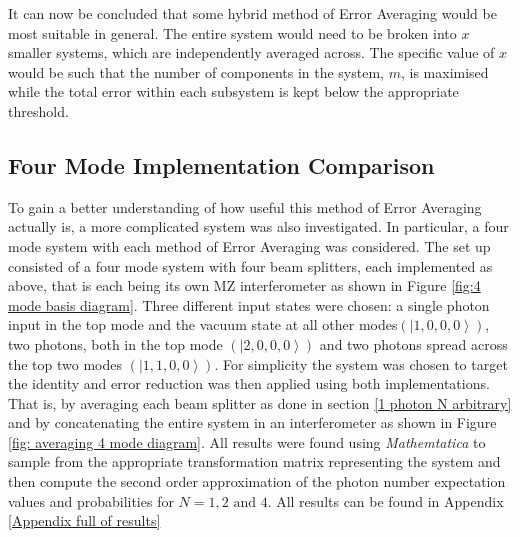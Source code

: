 \documentclass[aps,pra,twocolumn,superscriptaddress,numerical,floatfix]{revtex4-1}
\begin{document}
It can now be concluded that some hybrid method of Error Averaging would be most suitable in general. The entire system would need to be broken into $x$ smaller systems, which are independently averaged across. The specific value of $x$ would be such that the number of components in the system, $m$, is maximised while the total error within each subsystem is kept below the appropriate threshold.

\subsection{Four Mode Implementation Comparison \label{Four Mode Impementation Comparison}}

To gain a better understanding of how useful this method of Error Averaging actually is, a more complicated system was also investigated. In particular, a four mode system with each method of Error Averaging was considered. The set up consisted of a four mode system with four beam splitters, each implemented as above, that is each being its own MZ interferometer as shown in Figure \ref{fig:4 mode basis diagram}. Three different input states were chosen: a single photon input in the top mode and the vacuum state at all other modes$\left(\left|1,0,0,0\right\rangle \right)$, two photons, both in the top mode $\left(\left|2,0,0,0\right\rangle \right)$ and two photons spread across the top two modes $\left(\left|1,1,0,0\right\rangle \right)$. For simplicity the system was chosen to target the identity and error reduction was then applied using both implementations. That is, by averaging each beam splitter as done in section \ref{1 photon N arbitrary} and by concatenating the entire system in an interferometer as shown in Figure \ref{fig: averaging 4 mode diagram}. All results were found using \textit{Mathemtatica} to sample from the appropriate transformation matrix representing the system and then compute the second order approximation of the photon number expectation values and probabilities for $N=1, 2 \textrm{ and } 4$. All results can be found in Appendix \ref{Appendix full of results}
\end{document}
